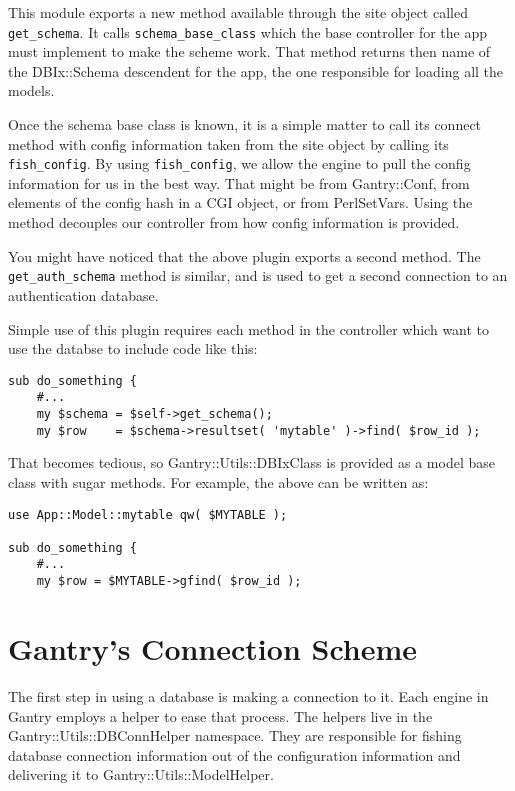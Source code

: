 This module exports a new method available through the site object called
\verb+get_schema+.  It calls \verb+schema_base_class+ which the base
controller for the app must implement to make the scheme work.  That
method returns then name of the DBIx::Schema descendent for the app, the
one responsible for loading all the models.

Once the schema base class is known, it is a simple matter to call its
connect method with config information taken from the site object by
calling its \verb+fish_config+.  By using \verb+fish_config+, we allow
the engine to pull the config information for us in the best way.
That might be from Gantry::Conf, from elements of the config hash in
a CGI object, or from PerlSetVars.  Using the method decouples our controller
from how config information is provided.

You might have noticed that the above plugin exports a second method.
The \verb+get_auth_schema+ method is similar, and is used to get a second
connection to an authentication database.

Simple use of this plugin requires each method in the controller which
want to use the databse to include code like this:

\begin{verbatim}
sub do_something {
    #...
    my $schema = $self->get_schema();
    my $row    = $schema->resultset( 'mytable' )->find( $row_id );
\end{verbatim}

That becomes tedious, so Gantry::Utils::DBIxClass is provided as a model
base class with sugar methods.  For example, the above can be written
as:

\begin{verbatim}
use App::Model::mytable qw( $MYTABLE );

sub do_something {
    #...
    my $row = $MYTABLE->gfind( $row_id );
\end{verbatim}

\section{Gantry's Connection Scheme}

The first step in using a database is making a connection to it.  Each
engine in Gantry employs a helper to ease that process.  The helpers
live in the Gantry::Utils::DBConnHelper namespace.  They are responsible
for fishing database connection information out of the configuration
information and delivering it to Gantry::Utils::ModelHelper.

